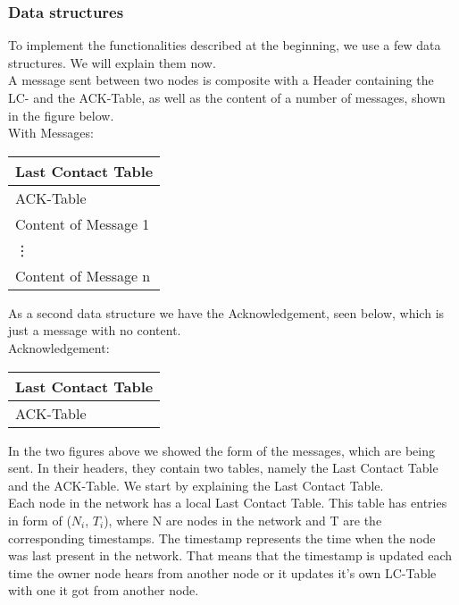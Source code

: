 	\subsubsection{Data structures}
	To implement the functionalities described at the beginning, we use a few data structures. We will explain them now. \\

	A message sent between two nodes is composite with a Header containing the LC- and the ACK-Table, as well as the content of a number of messages, shown in the figure below. \\

	With Messages:
		\begin{center}
			\begin{tabular}{ | l |}
				\hline
				Last Contact Table \\ \hline
				ACK-Table \\ \hline
				Content of Message 1\\ \hline
				\vdots\\ \hline
				Content of Message n\\ \hline
			\end{tabular}
		\end{center}


As a second data structure we have the Acknowledgement, seen below, which is just a message with no content. \\


	Acknowledgement:
		\begin{center}
			\begin{tabular}{ | l |}
				\hline
				Last Contact Table \\ \hline
				ACK-Table \\ \hline
			\end{tabular}
		\end{center}
			
In the two figures above we showed the form of the messages, which are being sent. In their headers, they contain two tables, namely the Last Contact Table and the ACK-Table. We start by explaining the Last Contact Table. \\

Each node in the network has a local Last Contact Table. This table has entries in form of ($N_{i}$, $T_{i}$), where N are nodes in the network and T are the corresponding timestamps. The timestamp represents the time when the node was last present in the network. That means that the timestamp is updated each time the owner node hears from another node or it updates it's own LC-Table with one it got from another node. \\

